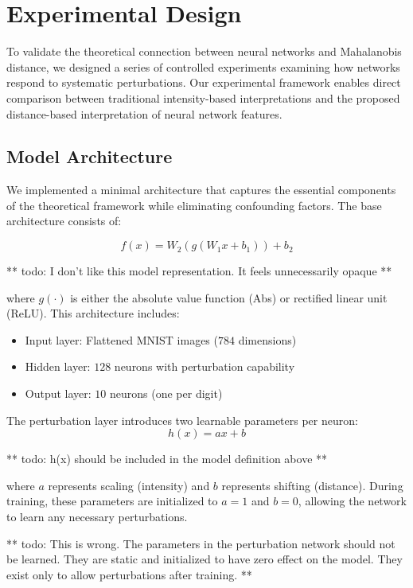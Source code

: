 \section{Experimental Design}

To validate the theoretical connection between neural networks and Mahalanobis distance, we designed a series of controlled experiments examining how networks respond to systematic perturbations. Our experimental framework enables direct comparison between traditional intensity-based interpretations and the proposed distance-based interpretation of neural network features.

\subsection{Model Architecture}
We implemented a minimal architecture that captures the essential components of the theoretical framework while eliminating confounding factors. The base architecture consists of:

\begin{equation}
    f(x) = W_2(g(W_1x + b_1)) + b_2
\end{equation}

** todo: I don't like this model representation. It feels unnecessarily opaque **

where $g(\cdot)$ is either the absolute value function (Abs) or rectified linear unit (ReLU). This architecture includes:

\begin{itemize}
    \item Input layer: Flattened MNIST images ($784$ dimensions)
    \item Hidden layer: $128$ neurons with perturbation capability
    \item Output layer: $10$ neurons (one per digit)
\end{itemize}

The perturbation layer introduces two learnable parameters per neuron:
\begin{equation}
    h(x) = ax + b
\end{equation}

** todo: h(x) should be included in the model definition above **

where $a$ represents scaling (intensity) and $b$ represents shifting (distance). During training, these parameters are initialized to $a=1$ and $b=0$, allowing the network to learn any necessary perturbations.

** todo: This is wrong. The parameters in the perturbation network should not be learned. They are static and initialized to have zero effect on the model. They exist only to allow perturbations after training. ** 

